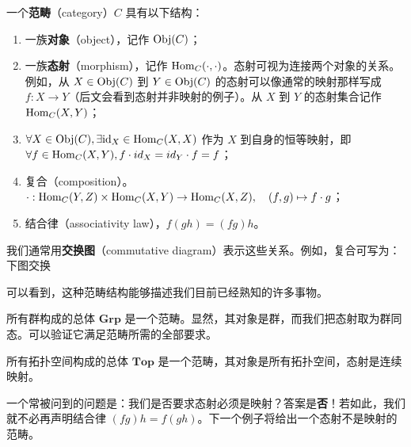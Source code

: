 \begin{definition}
一个\textbf{范畴}（category）$C$ 具有以下结构：
\begin{enumerate}
    \item 一族\textbf{对象}（object），记作 ${\rm Obj}(C)$；
    \item 一族\textbf{态射}（morphism），记作 ${\rm Hom}_C(\cdot , \cdot )$。态射可视为连接两个对象的关系。例如，从 $X \in {\rm Obj}(C) $ 到 $Y \in {\rm Obj}(C)$ 的态射可以像通常的映射那样写成 $f:X\to Y$（后文会看到态射并非映射的例子）。从 $X$ 到 $Y$ 的态射集合记作 ${\rm Hom}_C(X,Y)$；
    \item $\forall X\in {\rm Obj}(C), \exists {\rm id}_X \in {\rm Hom}_C(X,X)$ 作为 $X$ 到自身的恒等映射，即 $\forall f\in {\rm Hom}_C(X,Y), f\cdot id_X = id_Y\cdot f = f$；
    \item 复合（composition）。$\cdot :{\rm Hom}_C(Y,Z)\times {\rm Hom}_C(X,Y)\to {\rm Hom}_C(X,Z),\quad (f,g)\mapsto f\cdot g$；
    \item 结合律（associativity law），$f(gh) = (fg)h$。
\end{enumerate}
\end{definition}

我们通常用\textbf{交换图}（commutative diagram）表示这些关系。例如，复合可写为：下图交换

\begin{center}
\end{center}

可以看到，这种范畴结构能够描述我们目前已经熟知的许多事物。

\begin{example}
所有群构成的总体 $\mathbf{Grp}$ 是一个范畴。显然，其对象是群，而我们把态射取为群同态。可以验证它满足范畴所需的全部要求。
\end{example}

\begin{example}
所有拓扑空间构成的总体 $\mathbf{Top}$ 是一个范畴，其对象是所有拓扑空间，态射是连续映射。
\end{example}

一个常被问到的问题是：我们是否要求态射必须是映射？答案是\textbf{否}！若如此，我们就不必再声明结合律 $(fg)h = f(gh)$。下一个例子将给出一个态射不是映射的范畴。

